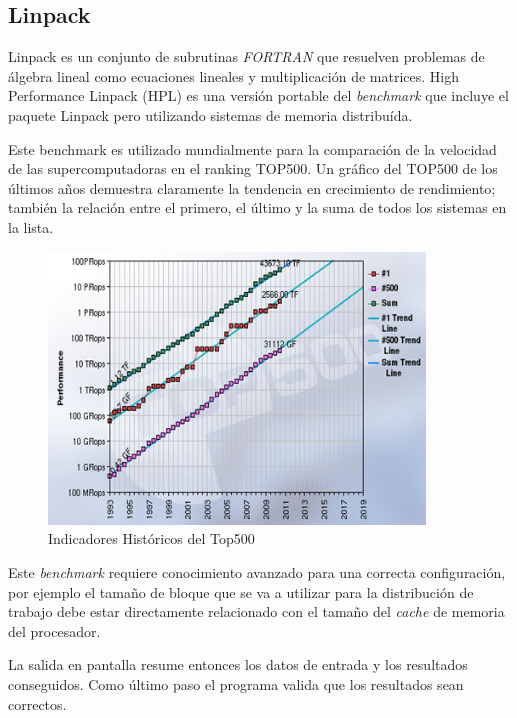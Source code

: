\documentclass[a4paper]{report}
\begin{document}
\subsection{Linpack}

Linpack \cite{linpack} es un conjunto de subrutinas {\it FORTRAN} que resuelven
problemas de \'algebra lineal como ecuaciones lineales y multiplicaci\'on de
matrices. High Performance Linpack (HPL) \cite{hpl} es una versi\'on portable del {\it benchmark} que incluye
el paquete Linpack pero utilizando sistemas de memoria distribu\'ida.

\bigskip

Este benchmark es utilizado mundialmente para la comparaci\'on de la
velocidad de las supercomputadoras en el ranking TOP500. 
Un gr\'afico del TOP500 de los \'ultimos a\~nos demuestra claramente la
tendencia en crecimiento de rendimiento; tambi\'en la relaci\'on entre el primero,
el \'ultimo y la suma de todos los sistemas en la lista.

\begin{figure}[H]
\begin{center}
\includegraphics[width=10cm]{top500.png}
\caption{Indicadores Hist\'oricos del Top500}
\end{center}
\end{figure}

Este {\it benchmark} requiere conocimiento avanzado para una correcta configuraci\'on,
por ejemplo el tama\~no de bloque que se va a utilizar para la distribuci\'on de trabajo
debe estar directamente relacionado con el tama\~no del {\it cache} de memoria del procesador.

\bigskip

La salida en pantalla resume entonces los datos de entrada y los resultados conseguidos.
Como \'ultimo paso el programa valida que los resultados sean correctos.
\end{document}
